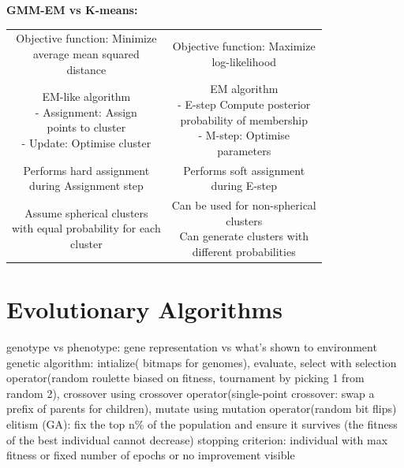 \documentclass[a4paper, 10pt, twocolumn]{article}
\begin{document}
\textbf{GMM-EM vs K-means:} \\
\begin{tabular}{| c | c |}
	\hline
	\thead{\textbf{K-means}} & \thead{\textbf{GMM-EM}} \\
	\hline
	\thead{Objective function: Minimize \\ average mean squared \\ distance} & \thead{Objective function: Maximize \\ log-likelihood} \\
	\hline
	\thead{EM-like algorithm \\ - Assignment: Assign \\ points to cluster \\ - Update: Optimise cluster } & \thead{EM algorithm \\ - E-step Compute posterior \\ probability of membership \\ - M-step: Optimise \\ parameters} \\
	\hline
	\thead{Performs hard assignment \\ during Assignment step} & \thead{Performs soft assignment \\ during E-step} \\
	\hline
	\thead{Assume spherical clusters \\ with equal probability for each \\ cluster} & \thead{Can be used for non-spherical \\clusters \\Can generate clusters with \\ different probabilities} \\
	\hline
\end{tabular}
\section{Evolutionary Algorithms}
genotype vs phenotype: gene representation vs what’s shown to environment genetic algorithm: intialize(
bitmaps for genomes), evaluate, select with selection operator(random roulette biased on fitness, tournament
by picking 1 from random 2), crossover using crossover operator(single-point crossover: swap a
prefix of parents for children), mutate using mutation operator(random bit flips)
elitism (GA): fix the top n\% of the population and ensure it survives (the fitness of the best individual
cannot decrease)
stopping criterion: individual with max fitness or fixed number of epochs or no improvement visible \\ \\
\end{document}

